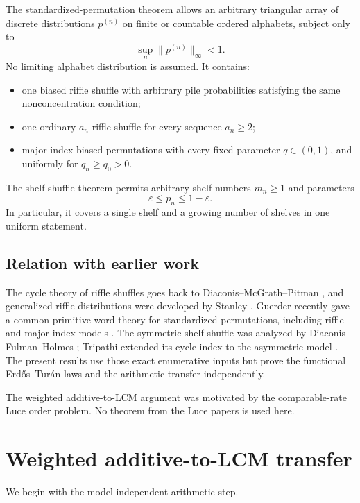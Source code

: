 \documentclass[11pt]{article}
\theoremstyle{definition}
\theoremstyle{remark}
\newcommand{\eps}{\varepsilon}
\begin{document}
The standardized-permutation theorem allows an arbitrary triangular array
of discrete distributions $p^{(n)}$ on finite or countable ordered
alphabets, subject only to
\[
 \sup_n\|p^{(n)}\|_\infty<1.
\]
No limiting alphabet distribution is assumed.  It contains:

\begin{itemize}[leftmargin=2em]
\item one biased riffle shuffle with arbitrary pile probabilities satisfying
the same nonconcentration condition;
\item one ordinary $a_n$-riffle shuffle for every sequence $a_n\ge2$;
\item major-index-biased permutations with every fixed parameter
$q\in(0,1)$, and uniformly for $q_n\ge q_0>0$.
\end{itemize}

The shelf-shuffle theorem permits arbitrary shelf numbers $m_n\ge1$ and
parameters
\[
 \eps\le p_n\le1-\eps.
\]
In particular, it covers a single shelf and a growing number of shelves in
one uniform statement.

\subsection*{Relation with earlier work}

The cycle theory of riffle shuffles goes back to
Diaconis--McGrath--Pitman \cite{DiaconisMcGrathPitman1995}, and generalized
riffle distributions were developed by Stanley \cite{Stanley2001}.
Guerder recently gave a common primitive-word theory for standardized
permutations, including riffle and major-index models
\cite{Guerder2026}.  The symmetric shelf shuffle was analyzed by
Diaconis--Fulman--Holmes \cite{DiaconisFulmanHolmes2013}; Tripathi extended
its cycle index to the asymmetric model \cite{Tripathi2026}.  The present
results use those exact enumerative inputs but prove the functional
Erd\H{o}s--Tur\'an laws and the arithmetic transfer independently.

The weighted additive-to-LCM argument was motivated by the comparable-rate
Luce order problem.  No theorem from the Luce papers is used here.

\section{Weighted additive-to-LCM transfer}

We begin with the model-independent arithmetic step.
\end{document}
